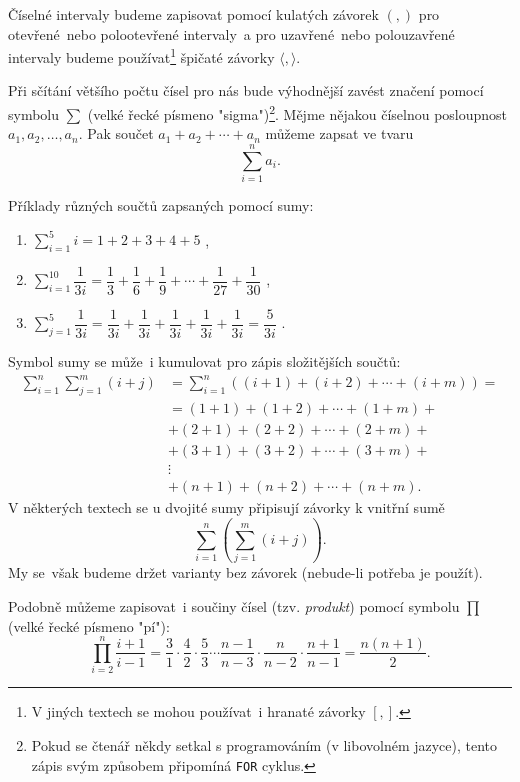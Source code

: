 Číselné intervaly budeme zapisovat pomocí kulatých závorek $(,)$ pro otevřené~nebo polootevřené intervaly~a pro uzavřené~nebo polouzavřené intervaly budeme používat\footnote{V jiných textech se mohou používat~i hranaté závorky $[,]$.} špičaté závorky $\langle,\rangle$.\par
\medskip
Při sčítání většího počtu čísel pro nás bude výhodnější zavést značení pomocí symbolu $\sum$ (velké řecké písmeno "sigma")\footnote{Pokud se čtenář někdy setkal s programováním (v libovolném jazyce), tento zápis svým způsobem připomíná \texttt{FOR} cyklus.}. Mějme nějakou číselnou posloupnost $a_1,a_2,\dots,a_n$. Pak součet $a_1+a_2+\cdots+a_n$ můžeme zapsat ve tvaru
\begin{equation*}
    \sum_{i=1}^{n}{a_i}.
\end{equation*}
\begin{example}\label{ex:uziti_sum}
    Příklady různých součtů zapsaných pomocí sumy:
    \begin{enumerate}[label=(\roman*)]
        \item $\displaystyle \sum_{i=1}^{5}{i}=1+2+3+4+5$ ,
        \item $\displaystyle \sum_{i=1}^{10}{\dfrac{1}{3i}}=\dfrac{1}{3}+\dfrac{1}{6}+\dfrac{1}{9}+\cdots+\dfrac{1}{27}+\dfrac{1}{30}$ ,
        \item $\displaystyle \sum_{j=1}^{5}{\dfrac{1}{3i}}=\dfrac{1}{3i}+\dfrac{1}{3i}+\dfrac{1}{3i}+\dfrac{1}{3i}+\dfrac{1}{3i}=\dfrac{5}{3i}$ .
    \end{enumerate}
\end{example}
Symbol sumy se může~i kumulovat pro zápis složitějších součtů:
\begin{align*}
    \sum_{i=1}^{n}{\sum_{j=1}^{m}{(i+j)}}&=\sum_{i=1}^{n}{\left((i+1)+(i+2)+\cdots+(i+m)\right)}=\\
    &=(1+1)+(1+2)+\cdots+(1+m)+\\
    &+(2+1)+(2+2)+\cdots+(2+m)+\\
    &+(3+1)+(3+2)+\cdots+(3+m)+\\
    &\vdots\\
    &+(n+1)+(n+2)+\cdots+(n+m).
\end{align*}
V některých textech se u dvojité sumy připisují závorky k vnitřní sumě
\begin{equation*}
    \sum_{i=1}^{n}{\left(\sum_{j=1}^{m}{(i+j)}\right)}.
\end{equation*}
My se~však budeme držet varianty bez závorek (nebude-li potřeba je použít).\par
Podobně můžeme zapisovat~i součiny čísel (tzv. \emph{produkt}) pomocí symbolu $\prod$ (velké řecké písmeno "pí"):
\begin{equation*}
    \prod_{i=2}^{n}{\dfrac{i+1}{i-1}}=\dfrac{3}{1}\cdot\dfrac{4}{2}\cdot\dfrac{5}{3}\cdots\dfrac{n-1}{n-3}\cdot\dfrac{n}{n-2}\cdot\dfrac{n+1}{n-1}=\dfrac{n(n+1)}{2}.
\end{equation*}


